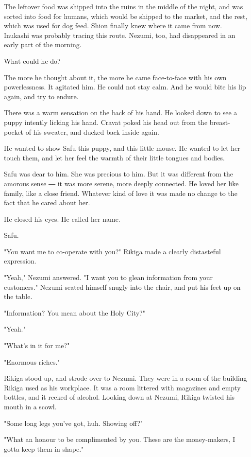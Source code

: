 The leftover food was shipped into the ruins in the middle of the night,
and was sorted into food for humans, which would be shipped to the
market, and the rest, which was used for dog feed. Shion finally knew
where it came from now. Inukashi was probably tracing this route.
Nezumi, too, had disappeared in an early part of the morning.

What could he do?

The more he thought about it, the more he came face-to-face with his own
powerlessness. It agitated him. He could not stay calm. And he would
bite his lip again, and try to endure.

There was a warm sensation on the back of his hand. He looked down to
see a puppy intently licking his hand. Cravat poked his head out from
the breast-pocket of his sweater, and ducked back inside again.

He wanted to show Safu this puppy, and this little mouse. He wanted to
let her touch them, and let her feel the warmth of their little tongues
and bodies.

Safu was dear to him. She was precious to him. But it was different from
the amorous sense ― it was more serene, more deeply connected. He loved
her like family, like a close friend. Whatever kind of love it was made
no change to the fact that he cared about her.

He closed his eyes. He called her name.

Safu.

"You want me to co-operate with you?" Rikiga made a clearly distasteful
expression.

"Yeah," Nezumi answered. "I want you to glean information from your
customers." Nezumi seated himself snugly into the chair, and put his
feet up on the table.

"Information? You mean about the Holy City?"

"Yeah."

"What's in it for me?"

"Enormous riches."

Rikiga stood up, and strode over to Nezumi. They were in a room of the
building Rikiga used as his workplace. It was a room littered with
magazines and empty bottles, and it reeked of alcohol. Looking down at
Nezumi, Rikiga twisted his mouth in a scowl.

"Some long legs you've got, huh. Showing off?"

"What an honour to be complimented by you. These are the money-makers, I
gotta keep them in shape."

